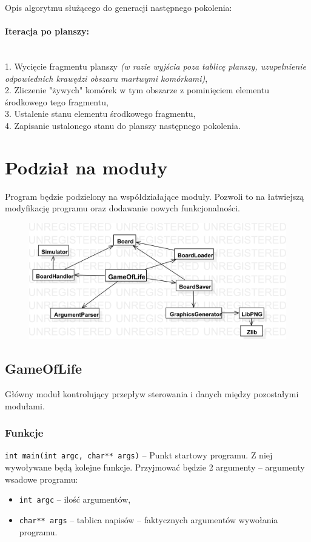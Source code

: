 \documentclass{article}
\begin{document}
Opis algorytmu służącego do generacji następnego pokolenia:

\noindent\paragraph{Iteracja po planszy:}\mbox{}\\
	1. Wycięcie fragmentu planszy
		\textit{(w razie wyjścia poza tablicę planszy, uzupełnienie odpowiednich krawędzi obszaru martwymi komórkami)},\\
	2. Zliczenie "żywych" komórek w tym obszarze z pominięciem elementu środkowego tego fragmentu,\\
	3. Ustalenie stanu elementu środkowego fragmentu,\\
	4. Zapisanie ustalonego stanu do planszy następnego pokolenia.\\


\section{Podział na moduły}
Program będzie podzielony na współdziałające moduły. Pozwoli to na łatwiejszą modyfikację programu oraz dodawanie nowych funkcjonalności.

\begin{figure}
	\centering
	\def\svgwidth{\columnwidth}
	\includegraphics[width=13cm]{diagram_modolow.png}
\end{figure}	

\subsection{GameOfLife}
Główny moduł kontrolujący przepływ sterowania i danych między pozostałymi modułami.

\subsubsection{Funkcje}
\texttt{int main(int argc, char** args)} -- Punkt startowy programu. Z niej wywoływane będą kolejne funkcje. Przyjmować będzie 2 argumenty -- argumenty wsadowe programu:
\begin{itemize}[label={}]
	\item\texttt{int argc} -- ilość argumentów,
	\item\texttt{char** args} -- tablica napisów -- faktycznych argumentów wywołania programu.
\end{itemize}
\end{document}
